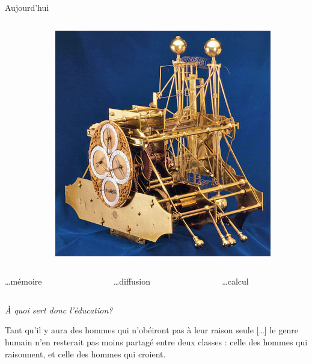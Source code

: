 \begin{frame}{Aujourd'hui}
\begin{columns}
\begin{column}{0.33\linewidth}
\end{column}
\begin{column}{0.33\linewidth}
\centering
\includegraphics[height=0.35\paperheight]{../resources/illustrations/harrison} \\
\end{column}
\end{columns}

\vfill

\begin{columns}
\begin{column}{0.33\linewidth}
\centering
\ldots mémoire
\end{column}
\begin{column}{0.33\linewidth}
\centering
\ldots diffusion
\end{column}
\begin{column}{0.33\linewidth}
\centering
\ldots calcul
\end{column}
\end{columns}
\end{frame}
\begin{frame}
\centering
\huge \emph{À quoi sert donc l'éducation?}
\vfill
\centering
\large
\begin{coolquote}
Tant qu'il y aura des hommes qui n'obéiront pas à leur raison seule [\ldots] le genre humain n'en resterait pas moins partagé entre deux classes : celle des hommes qui raisonnent, et celle 
des hommes qui croient.
\end{coolquote}
\vfill
\end{frame}


